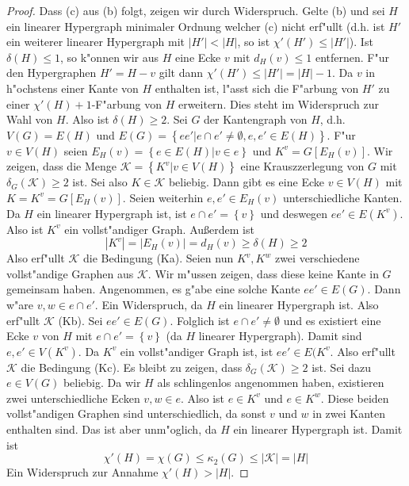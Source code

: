 \begin{proof}
  Dass (c) aus (b) folgt, zeigen wir durch Widerspruch. Gelte (b) und sei $H$ ein linearer Hypergraph minimaler Ordnung welcher (c) nicht erf"ullt (d.h. ist $H'$ ein weiterer linearer Hypergraph mit $|H'| < |H|$, so ist $\chi'(H') \leq | H'|$). Ist $\delta(H) \leq 1$, so k"onnen wir aus $H$ eine Ecke $v$ mit $d_H(v) \leq 1$ entfernen. F"ur den Hypergraphen $H' = H - v $ gilt dann $\chi'(H') \leq |H'| = |H|-1$. Da $v$ in h"ochstens einer Kante von $H$ enthalten ist, l"asst sich die F"arbung
  von $H'$ zu einer $\chi'(H) +1$-F"arbung von $H$ erweitern.
  Dies steht im Widerspruch zur Wahl von  $H$.  Also ist $\delta(H) \geq 2$. Sei $G$ der Kantengraph von $H$, d.h. $V(G) = E(H)$ und $E(G) = \left\{ ee'|e\cap e' \neq \emptyset, e,e' \in E(H) \right\}$. F"ur $v\in V(H)$ seien $E_{H}(v) = \left\{ e \in E(H) | v\in e \right\}$ und $K^{v} = G[E_H(v)]$.
  Wir zeigen, dass die Menge $\mathcal K = \left\{ K^{v}| v \in V(H) \right\}$ eine Krauszzerlegung von $G$  mit $\delta_{G}(\mathcal{K}) \geq 2$ ist.
  Sei also $K \in \mathcal{K} $ beliebig. Dann gibt es eine Ecke $v\in V(H)$ mit $K = K^{v} = G[E_{H}(v)]$. Seien weiterhin $e,e' \in E_H(v)$ unterschiedliche Kanten. Da $H$ ein linearer Hypergraph ist, ist $e\cap e' = \left\{ v \right\}$ und deswegen $ee'\in E(K^{v})$. Also ist $K^{v}$ ein vollst"andiger Graph.
  Au{\ss}erdem ist \begin{equation*}
    |K^{v}| = |E_{H}(v)|= d_{H}(v) \geq \delta(H) \geq 2
  \end{equation*}
  Also erf"ullt $\mathcal{K}$ die Bedingung (Ka). Seien nun $K^{v},K^{w}$ zwei verschiedene vollst"andige Graphen aus $\mathcal{K}$. Wir m"ussen zeigen, dass diese keine Kante in $G$ gemeinsam haben. Angenommen, es g"abe eine solche Kante $ee'\in E(G)$. Dann w"are $v,w \in e \cap e'$. Ein Widerspruch, da $H$ ein linearer Hypergraph ist. Also erf"ullt  $\mathcal{K}$ (Kb). Sei $ee'\in E(G)$. Folglich ist $e\cap e' \neq \emptyset$ und es existiert eine Ecke $v$ von $H$ mit $e \cap e ' = \left\{ v
  \right\}$ (da $H$ linearer Hypergraph). Damit sind $e,e'\in V(K^{v})$. Da $K^{v}$ ein vollst"andiger Graph ist, ist $ee'\in E(K^{v}$. Also erf"ullt $\mathcal{K}$ die Bedingung (Kc). 
  Es bleibt zu zeigen, dass $\delta_{G}(\mathcal{K}) \geq 2$ ist. Sei dazu $e \in V(G)$ beliebig. Da wir $H$ als schlingenlos angenommen haben, existieren zwei unterschiedliche Ecken $v,w \in e$. Also ist $e\in K^{v}$ und $e\in K^{w}$. Diese beiden vollst"andigen Graphen sind unterschiedlich, da sonst $v$ und $w$ in zwei Kanten enthalten sind.  Das ist aber unm"oglich, da $H$ ein linearer Hypergraph ist. 
  Damit ist \begin{equation*}
    \chi'(H) = \chi(G) \leq \kappa_{2}(G) \leq |\mathcal{K}| = |H|
  \end{equation*}
  Ein Widerspruch zur Annahme $\chi'(H) > |H|$.
\end{proof}
